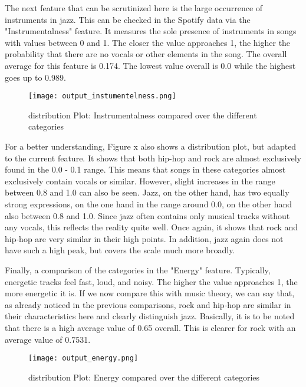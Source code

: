 The next feature that can be scrutinized here is the large occurrence of instruments in jazz.
This can be checked in the Spotify data via the "Instrumentalness" feature.
It measures the sole presence of instruments in songs with values between 0 and 1.
The closer the value approaches 1, the higher the probability that there are no vocals or other
elements in the song. The overall average for this feature is 0.174.
The lowest value overall is 0.0 while the highest goes up to 0.989.

\begin{figure}[H]
    \centering
    \caption[]{distribution Plot: Instrumentalness compared over the different categories}
	\label{fig:du_dp_instrumentaness}
    \texttt{[image: output\_instumentelness.png]}
\end{figure}

For a better understanding, Figure x  also shows a distribution plot,
but adapted to the current feature.
It shows that both hip-hop and rock are almost exclusively found in the 0.0 - 0.1 range.
This means that songs in these categories almost exclusively contain vocals or similar.
However, slight increases in the range between 0.8 and 1.0 can also be seen. Jazz,
on the other hand, has two equally strong expressions, on the one hand in the range around 0.0,
on the other hand also between 0.8 and 1.0. Since jazz often contains only musical tracks without
any vocals, this reflects the reality quite well.
Once again, it shows that rock and hip-hop are very similar in their high points.
In addition, jazz again does not have such a high peak, but covers the scale much more broadly.

Finally, a comparison of the categories in the "Energy" feature.
Typically, energetic tracks feel fast, loud, and noisy.
The higher the value approaches 1, the more energetic it is.
If we now compare this with music theory, we can say that, as already noticed in the previous
comparisons, rock and hip-hop are similar in their characteristics here and clearly distinguish jazz.
Basically, it is to be noted that there is a high average value of 0.65 overall.
This is clearer for rock with an average value of 0.7531.

\begin{figure}[H]
    \centering
    \caption[]{distribution Plot: Energy compared over the different categories}
	\label{fig:du_dp_enegry}
    \texttt{[image: output\_energy.png]}
\end{figure}

